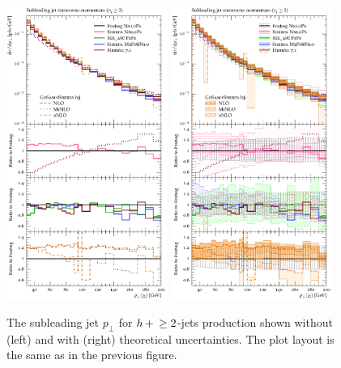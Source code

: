 \begin{figure}[t!]
  \centering
  \includegraphics[width=0.47\textwidth]{figures/hjetscomp_u_jet2_pT_incl.pdf}
  \hfill
  \includegraphics[width=0.47\textwidth]{figures/hjetscomp_jet2_pT_incl.pdf}
  \caption{\label{fig:hjetscomp:results:2obs:jet2_pt}%
    The subleading jet $p_\perp$ for $h\!\text{~+~}\!\ge2$-jets production shown
    without (left) and with (right) theoretical uncertainties. The
    plot layout is the same as in the previous figure.
    }
\end{figure}

